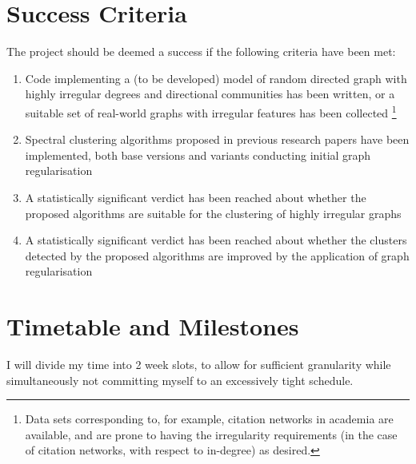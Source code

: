 \documentclass[a4paper,12pt]{article}
\begin{document}
\section*{Success Criteria}
	The project should be deemed a success if the following criteria have been met:
	\begin{enumerate}
		\item Code implementing a (to be developed) model of random directed graph 
		with highly irregular degrees and directional communities has been written, 
		or a suitable set of real-world graphs with irregular features has been collected%
		\footnote{Data sets corresponding to, for example, citation networks in academia are
		available, and are prone to having the irregularity requirements (in the case of 
		citation networks, with respect to in-degree) as desired.}
		\item Spectral clustering algorithms proposed in previous research papers have 
		been implemented, both base versions and variants conducting initial graph 
		regularisation
		\item A statistically significant verdict has been reached about whether the 
		proposed algorithms are suitable for the clustering of highly irregular graphs 
		\item A statistically significant verdict has been reached about whether the 
		clusters detected by the proposed algorithms are improved by the application of 
		graph regularisation 
	\end{enumerate}

\section*{Timetable and Milestones}

I will divide my time into 2 week slots, to allow for sufficient granularity while simultaneously not committing myself to an excessively tight schedule.
\end{document}
